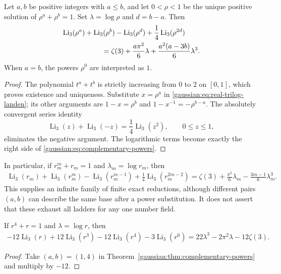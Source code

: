 \begin{theorem}
\label{gaussian:thm:complementary-powers}
Let $a,b$ be positive integers with $a\le b$, and let $0<\rho<1$ be
the unique positive solution of $\rho^a+\rho^b=1$. Set
$\lambda=\log\rho$ and $d=b-a$. Then
\begin{align}
&\operatorname{Li}_3(\rho^a)+\operatorname{Li}_3(\rho^b)
 -\operatorname{Li}_3(\rho^d)
 +\frac14\operatorname{Li}_3(\rho^{2d})\notag\\
&\hspace{20mm}=\zeta(3)+\frac{a\pi^2}{6}\lambda
 +\frac{a^2(a-3b)}{6}\lambda^3.
\label{gaussian:eq:complementary-powers}
\end{align}
When $a=b$, the powers $\rho^0$ are interpreted as $1$.
\end{theorem}

\begin{proof}
The polynomial $t^a+t^b$ is strictly increasing from $0$ to $2$ on
$[0,1]$, which proves existence and uniqueness. Substitute $x=\rho^a$
in \eqref{gaussian:eq:real-trilog-landen}; its other arguments are
$1-x=\rho^b$ and $1-x^{-1}=-\rho^{b-a}$. The absolutely convergent
series identity
\[
\operatorname{Li}_3(z)+\operatorname{Li}_3(-z)
 =\frac14\operatorname{Li}_3(z^2),\qquad 0\le z\le1,
\]
eliminates the negative argument. The logarithmic terms become exactly
the right side of \eqref{gaussian:eq:complementary-powers}.
\end{proof}

In particular, if $r_m^m+r_m=1$ and $\lambda_m=\log r_m$, then
\begin{align}
\operatorname{Li}_3(r_m)+\operatorname{Li}_3(r_m^m)
 -\operatorname{Li}_3(r_m^{m-1})
 +\frac14\operatorname{Li}_3(r_m^{2m-2})
 =\zeta(3)+\frac{\pi^2}{6}\lambda_m
 -\frac{3m-1}{6}\lambda_m^3.
\label{gaussian:eq:all-m-trilog}
\end{align}
This supplies an infinite family of finite exact reductions, although
different pairs $(a,b)$ can describe the same base after a power
substitution. It does not assert that these exhaust all ladders for
any one number field.

\begin{corollary}
If $r^4+r=1$ and $\lambda=\log r$, then
\begin{align}
-12\operatorname{Li}_3(r)+12\operatorname{Li}_3(r^3)
 -12\operatorname{Li}_3(r^4)-3\operatorname{Li}_3(r^6)
 =22\lambda^3-2\pi^2\lambda-12\zeta(3).
\label{gaussian:eq:quartic-proved}
\end{align}
\end{corollary}
\begin{proof}
Take $(a,b)=(1,4)$ in Theorem~\ref{gaussian:thm:complementary-powers}
and multiply by $-12$.
\end{proof}


